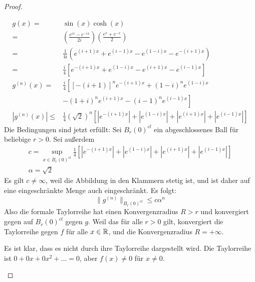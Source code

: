\begin{proof}
	\begin{parts}
	\item \begin{align*}
			g(x)=&\sin(x)\cosh(x)\\
			=&\left( \frac{e^{ix}-e^{-ix}}{2i} \right) \left( \frac{e^x+e^{-x}}{2} \right) \\
			=& \frac{1}{4i}\left( e^{(i+1)x}+e^{(i-1)x}-e^{(1-i)x}-e^{-(i+1)x} \right)\\
			=& \frac{i}{4}\left[ e^{-(i+1)x}+e^{(1-i)x}-e^{(i+1)x}-e^{(i-1)x} \right]\\
			g^{(n)}(x)=&\frac{i}{4}\left[ \left[ -(i+1) \right]^n e^{-(i+1)x}+(1-i)^n e^{(1-i)x}\right.\\
 &\left.-(1+i)^n e^{(i+1)x}-(i-1)^n e^{(i-1)x} \right]\\
			|g^{(n)}(x)|\le& \frac{1}{4}(\sqrt{2})^n\left[ \left| e^{-(i+1)x} \right| +\left| e^{(1-i)x} \right| +\left| e^{(i+1)x} \right| +\left| e^{(i-1)x} \right|   \right] 
		\end{align*}
		Die Bedingungen sind jetzt erfüllt: Sei $B_r(0)^{cl}$ ein abgeschlossenes Ball für beliebige $r>0$. Sei außerdem
\begin{gather*}
			c=\sup_{x\in B_r(0)^{cl}}\frac{1}{4}\left[ \left| e^{-(i+1)x} \right| +\left| e^{(1-i)x} \right| +\left| e^{(i+1)x} \right| +\left| e^{(i-1)x} \right|   \right]\\
			\alpha=\sqrt{2} 
\end{gather*}
Es gilt $c\neq \infty$, weil die Abbildung in den Klammern stetig ist, und ist daher auf eine eingeschränkte Menge auch eingeschränkt. Es folgt:
\begin{equation}\tag{5.6.23}
	\|g^{(n)}\|_{B_r(0)^{cl}}\le c\alpha^n
\end{equation}
Also die formale Taylorreihe hat einen Konvergenzradius $R>r$ und konvergiert gegen auf $B_r(0)^{cl}$ gegen $g$. Weil das f\"{u}r alle $r>0$ gilt, konvergiert die Taylorreihe gegen $f$ f\"{u}r alle $x\in \mathbb{R}$, und die Konvergenzradius $R=+\infty$.
\item Es ist klar, dass es nicht durch ihre Taylorreihe dargestellt wird. Die Taylorreihe ist $0+0x+0x^2+\dots=0$, aber $f(x)\neq 0$ f\"{u}r $x\neq 0$.


\end{parts}
\end{proof}
